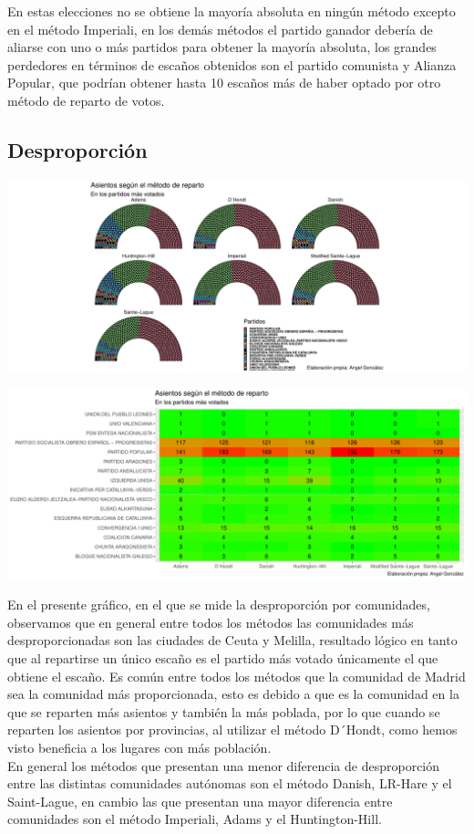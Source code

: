 \documentclass[12pt,a4paper,]{book}
\numberwithin{dummy}{section}
\theoremstyle{ocrenumbox}
\theoremstyle{blacknumex}
\theoremstyle{blacknumbox}
\theoremstyle{ocrenum}
\theoremstyle{ocrenum}
\begin{document}
En estas elecciones no se obtiene la mayoría absoluta en ningún método
excepto en el método Imperiali, en los demás métodos el partido ganador
debería de aliarse con uno o más partidos para obtener la mayoría
absoluta, los grandes perdedores en términos de escaños obtenidos son el
partido comunista y Alianza Popular, que podrían obtener hasta 10
escaños más de haber optado por otro método de reparto de votos.

\hypertarget{desproporciuxf3n}{%
\subsection{Desproporción}\label{desproporciuxf3n}}

\begin{center}\includegraphics[width=1\linewidth]{figurasR/unnamed-chunk-74-1} \end{center}

\begin{center}\includegraphics[width=1\linewidth]{figurasR/unnamed-chunk-74-2} \end{center}

En el presente gráfico, en el que se mide la desproporción por
comunidades, observamos que en general entre todos los métodos las
comunidades más desproporcionadas son las ciudades de Ceuta y Melilla,
resultado lógico en tanto que al repartirse un único escaño es el
partido más votado únicamente el que obtiene el escaño. Es común entre
todos los métodos que la comunidad de Madrid sea la comunidad más
proporcionada, esto es debido a que es la comunidad en la que se
reparten más asientos y también la más poblada, por lo que cuando se
reparten los asientos por provincias, al utilizar el método D´Hondt,
como hemos visto beneficia a los lugares con más población.\\
En general los métodos que presentan una menor diferencia de
desproporción entre las distintas comunidades autónomas son el método
Danish, LR-Hare y el Saint-Lague, en cambio las que presentan una mayor
diferencia entre comunidades son el método Imperiali, Adams y el
Huntington-Hill.
\end{document}
